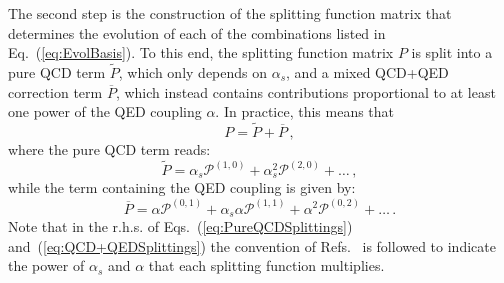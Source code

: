 The second step is the construction of the splitting function matrix that
determines the evolution of each of the combinations listed in
Eq.~(\ref{eq:EvolBasis}).
%
To this end, the splitting function matrix $P$ is split into a pure
QCD term $\widetilde{P}$, which only depends on $\alpha_s$, and a
mixed QCD+QED correction term $\overline{P}$, which instead contains
contributions proportional to at least one power of the QED coupling
$\alpha$.
%
In practice, this means that
\begin{equation}
P = \widetilde{P} + \overline{P}\,,
\end{equation}
where the pure QCD term reads:
\begin{equation}\label{eq:PureQCDSplittings}
\widetilde{P} = \alpha_s \mathcal{P}^{(1,0)} + \alpha_s^2 \mathcal{P}^{(2,0)}+\dots\, ,
\end{equation}
while the term containing the QED coupling is given by:
\begin{equation}\label{eq:QCD+QEDSplittings}
\overline{P} = \alpha \mathcal{P}^{(0,1)} + \alpha_s\alpha \mathcal{P}^{(1,1)}+\alpha^2 \mathcal{P}^{(0,2)} + \dots \, .
\end{equation}
Note that in the r.h.s. of Eqs.~(\ref{eq:PureQCDSplittings})
and~(\ref{eq:QCD+QEDSplittings}) the convention of
Refs.~\cite{deFlorian:2015ujt,deFlorian:2016gvk} is followed to indicate the power
of $\alpha_s$ and $\alpha$ that each splitting function multiplies.

